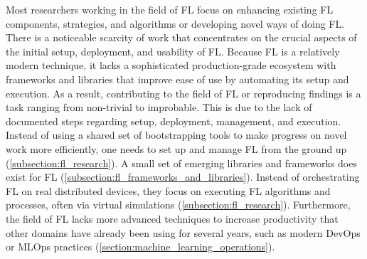 Most researchers working in the field of FL focus on enhancing existing FL components, strategies, and algorithms or developing novel ways of doing FL.
There is a noticeable scarcity of work that concentrates on the crucial aspects of the initial setup, deployment, and usability of FL.
Because FL is a relatively modern technique, it lacks a sophisticated production-grade ecosystem with frameworks and libraries that improve ease of use by automating its setup and execution.
As a result, contributing to the field of FL or reproducing findings is a task ranging from non-trivial to improbable.
This is due to the lack of documented steps regarding setup, deployment, management, and execution.
Instead of using a shared set of bootstrapping tools to make progress on novel work more efficiently, one needs to set up and manage FL from the ground up (\ref{subsection:fl_research}).
A small set of emerging libraries and frameworks does exist for FL (\ref{subsection:fl_frameworks_and_libraries}).
Instead of orchestrating FL on real distributed devices, they focus on executing FL algorithms and processes, often via virtual simulations (\ref{subsection:fl_research}). 
Furthermore, the field of FL lacks more advanced techniques to increase productivity that other domains have already been using for several years, such as modern DevOps or MLOps practices (\ref{section:machine_learning_operations}).